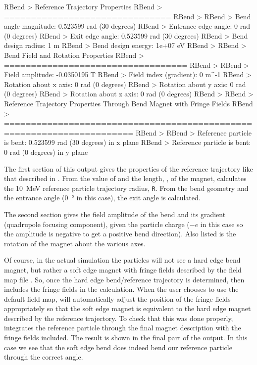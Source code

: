 \begin{example}
RBend > Reference Trajectory Properties
RBend > ===============================
RBend >
RBend > Bend angle magnitude:    0.523599 rad (30 degrees)
RBend > Entrance edge angle:     0 rad (0 degrees)
RBend > Exit edge angle:         0.523599 rad (30 degrees)
RBend > Bend design radius:      1 m
RBend > Bend design energy:      1e+07 eV
RBend >
RBend > Bend Field and Rotation Properties
RBend > ==================================
RBend >
RBend > Field amplitude:         -0.0350195 T
RBend > Field index (gradient):  0 m^-1
RBend > Rotation about x axis:   0 rad (0 degrees)
RBend > Rotation about y axis:   0 rad (0 degrees)
RBend > Rotation about z axis:   0 rad (0 degrees)
RBend >
RBend > Reference Trajectory Properties Through Bend Magnet with Fringe Fields
RBend > ======================================================================
RBend >
RBend > Reference particle is bent: 0.523599 rad (30 degrees) in x plane
RBend > Reference particle is bent: 0 rad (0 degrees) in y plane
\end{example}
The first section of this output gives the properties of the reference trajectory like that described in
. From the value of  and the length, , of the magnet, \opal
calculates the \SI{10}{\mega\electronvolt} reference particle trajectory radius, \texttt{R}. From the bend geometry and the
entrance angle (\SI{0}{\degree} in this case), the exit angle is calculated.

The second section gives the field amplitude of the bend and its gradient (quadrupole focusing component),
given the particle charge ($-e$ in this case so the amplitude is negative to get a positive bend direction).
Also listed is the rotation of the magnet about the various axes.

Of course, in the actual simulation the particles will not see a hard edge bend magnet, but rather a soft
edge magnet with fringe fields described by the  field map file  .
So, once the hard edge bend/reference trajectory is determined, \opal
then includes the fringe fields in the calculation. When the user chooses to use the default field map,
\opal will automatically adjust the position of the fringe fields appropriately so that the soft edge magnet
is equivalent to the hard edge magnet described by the reference trajectory. To check that this was done
properly, \opal integrates the reference particle through the final magnet description with the fringe fields
included. The result is shown in the final part of the output. In this case we see that the soft edge bend
does indeed bend our reference particle through the correct angle.

